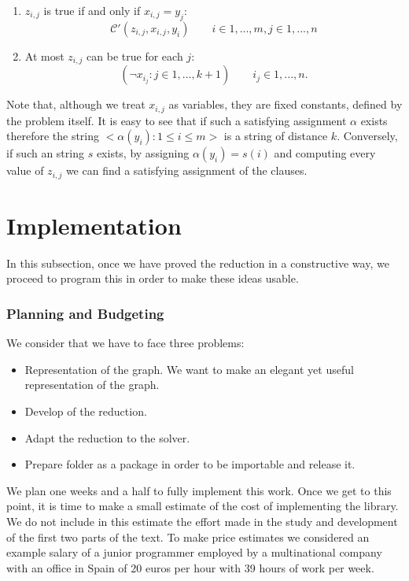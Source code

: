 \begin{enumerate}
\item $z_{i,j}$ is true if and only if $x_{i,j} = y_j$:
  $$\mathcal{C'} (z_{i,j},x_{i,j},y_i)  \qquad i \in 1,...,m, j \in 1,...,n$$
\item At most $z_{i,j}$ can be true for each $j$:
    $$(\neg x_{i_j} : j\in 1,...,k +1 ) \qquad  i_j \in 1,...,n.$$
\end{enumerate}

Note that, although we treat $x_{i,j}$ as variables, they are fixed constants, defined by the problem itself. It is easy to see that if such a satisfying assignment $\alpha$ exists therefore the string $<\alpha(y_i) : 1 \le i \le m>$ is a string of distance $k$. Conversely, if such an string $s$ exists, by assigning $\alpha(y_i) = s(i)$ and computing every value of $z_{i,j} $ we can find a satisfying assignment of the clauses.

\section{Implementation}

In this subsection, once we have proved the reduction in a constructive way, we proceed to program this in order to make these ideas usable.

\subsubsection{Planning and Budgeting}

We consider that we have to face three problems:
\begin{itemize}
\item Representation of the graph. We want to make an elegant yet useful representation of the graph. 
\item Develop of the reduction.
\item Adapt the reduction to the solver.
\item Prepare folder as a package in order to be importable and release it.
\end{itemize}


We plan one weeks and a half to fully implement this work. Once we get to this point, it is time to make a small estimate of the cost of implementing the library. We do not include in this estimate the effort made in the study and development of the first two parts of the text. To make price estimates we considered an example salary of a junior programmer employed by a multinational company with an office in Spain of 20 euros per hour with 39 hours of work per week.\\


